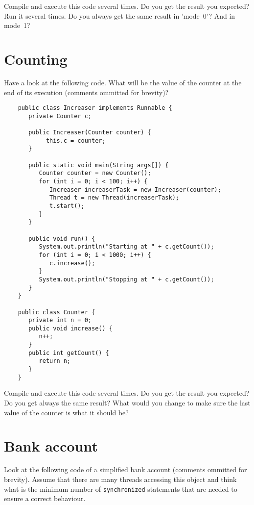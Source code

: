 \documentclass{article}
\begin{document}
Compile and execute this code several times. Do you get the result you
expected? Run it several times. Do you always get the same result in
'mode~0'? And in mode~1?

\section{Counting}
\label{sec:counter}

Have a look at the following code. What will be the value of the
counter at the end of its execution (comments ommitted for brevity)? 

\begin{verbatim}
    public class Increaser implements Runnable {
       private Counter c;
    
       public Increaser(Counter counter) {
            this.c = counter;
       }
    
       public static void main(String args[]) {
          Counter counter = new Counter();
          for (int i = 0; i < 100; i++) {
             Increaser increaserTask = new Increaser(counter);
             Thread t = new Thread(increaserTask);
             t.start();
          }
       }
    
       public void run() {
          System.out.println("Starting at " + c.getCount());
          for (int i = 0; i < 1000; i++) {
             c.increase();
          }
          System.out.println("Stopping at " + c.getCount());
       }
    }
    
    public class Counter {
       private int n = 0;
       public void increase() {
          n++;
       }
       public int getCount() {
          return n;
       }
    }
\end{verbatim}

Compile and execute this code several times. Do you get the result you
expected? Do you get always the same result? What would you change to make
sure the last value of the counter is what it should be?

\section{Bank account}
\label{sec:bank-account}

Look at the following code of a simplified bank account (comments
ommitted for brevity). Assume that
there are many threads accessing this object and think what is the
minimum number of \verb+synchronized+ statements that are needed to
ensure a correct behaviour. 
\end{document}

